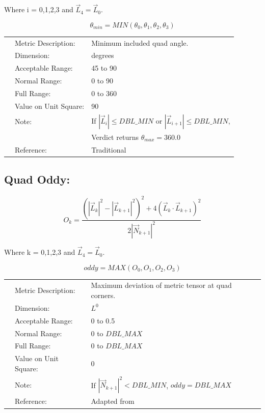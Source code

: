 \documentclass[12pt]{article}
\begin{document}
Where i = 0,1,2,3 and $\vec L_4 = \vec L_0$.

\begin{displaymath}
\theta_{min} = MIN\left( \theta_0, \theta_1, \theta_2, \theta_3 \right) 
\end{displaymath}


\begin{tabular}{lll}
& Metric Description:  & Minimum included quad angle.  \\
& Dimension:           & degrees                   \\ 
& Acceptable Range:    & 45 to 90 \\ 
& Normal Range:        & 0 to 90 \\ 
& Full Range:          & 0 to 360 \\ 
& Value on Unit Square:& 90 \\
& Note:                & If $|\vec L_i| \leq DBL\_MIN$ or $|\vec L_{i+1}| \leq DBL\_MIN$, \\
&                      & Verdict returns $\theta_{max} = 360.0$\\ 
& Reference:           & Traditional \\
\end{tabular} 


\subsection*{Quad Oddy:}

\begin{displaymath}
O_k = \frac{(| \vec L_k |^2 - | \vec L_{k+1} |^2)^2 + 4 (\vec L_k \cdot \vec L_{k+1})^2}{2 | \vec N_{k+1} |^2 }
\end{displaymath}

Where k = 0,1,2,3 and $\vec L_4 = \vec L_0$.

\begin{displaymath}
oddy =  MAX \left( O_0, O_1, O_2, O_3 \right)
\end{displaymath}

\begin{tabular}{lll}
& Metric Description:  & Maximum deviation of metric tensor at quad corners. \\
& Dimension:           & $L^0$              \\ 
& Acceptable Range:    & 0 to 0.5               \\ 
& Normal Range:        & 0 to $DBL\_MAX$ \\ 
& Full Range:          & 0 to $DBL\_MAX$ \\ 
& Value on Unit Square:& 0 \\
& Note:                & If $|\vec N_{k+1}|^2 < DBL\_MIN$, $oddy = DBL\_MAX$  \\
& Reference:           &  Adapted from \cite{six} \\
\end{tabular} 
\end{document}
